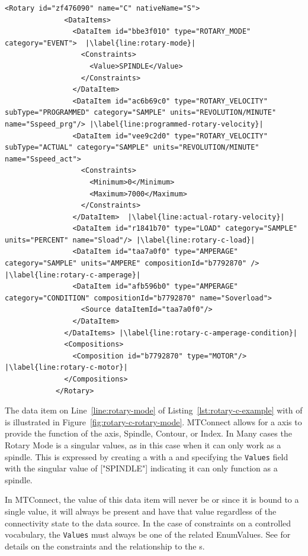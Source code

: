 \begin{lstlisting}[firstnumber=last,%
    caption={Rotary C Axis},label={lst:rotary-c-example},escapechar=|]
            <Rotary id="zf476090" name="C" nativeName="S">
              <DataItems>
                <DataItem id="bbe3f010" type="ROTARY_MODE" category="EVENT">  |\label{line:rotary-mode}|
                  <Constraints>
                    <Value>SPINDLE</Value>
                  </Constraints>
                </DataItem>
                <DataItem id="ac6b69c0" type="ROTARY_VELOCITY" subType="PROGRAMMED" category="SAMPLE" units="REVOLUTION/MINUTE" name="Sspeed_prg"/> |\label{line:programmed-rotary-velocity}|
                <DataItem id="vee9c2d0" type="ROTARY_VELOCITY" subType="ACTUAL" category="SAMPLE" units="REVOLUTION/MINUTE" name="Sspeed_act"> 
                  <Constraints>
                    <Minimum>0</Minimum>
                    <Maximum>7000</Maximum>
                  </Constraints>
                </DataItem>  |\label{line:actual-rotary-velocity}|
                <DataItem id="r1841b70" type="LOAD" category="SAMPLE" units="PERCENT" name="Sload"/> |\label{line:rotary-c-load}|
                <DataItem id="taa7a0f0" type="AMPERAGE" category="SAMPLE" units="AMPERE" compositionId="b7792870" /> |\label{line:rotary-c-amperage}|
                <DataItem id="afb596b0" type="AMPERAGE" category="CONDITION" compositionId="b7792870" name="Soverload">
                  <Source dataItemId="taa7a0f0"/>
                </DataItem>
              </DataItems> |\label{line:rotary-c-amperage-condition}|
              <Compositions>
                <Composition id="b7792870" type="MOTOR"/> |\label{line:rotary-c-motor}|
              </Compositions>
            </Rotary>
\end{lstlisting}

The data item on Line~\ref{line:rotary-mode} of Listing~\ref{lst:rotary-c-example} with  of  is illustrated in Figure~\ref{fig:rotary-c-rotary-mode}. MTConnect allows for a  axis to provide the function of the axis, Spindle, Contour, or Index. In Many cases the Rotary Mode is a singular values, as in this case when it can only work as a spindle. This is expressed by creating a  with a  and specifying the \texttt{Values} field with the singular value of ["SPINDLE"] indicating it can only function as a spindle. 

In MTConnect, the value of this data item will never be  or  since it is bound to a single value, it will always be present and have that value regardless of the connectivity state to the data source. In the case of constraints on a controlled vocabulary, the \texttt{Values} must always be one of the related EnumValues. See \cite{MTCPart2} for details on the constraints and the relationship to the s.

